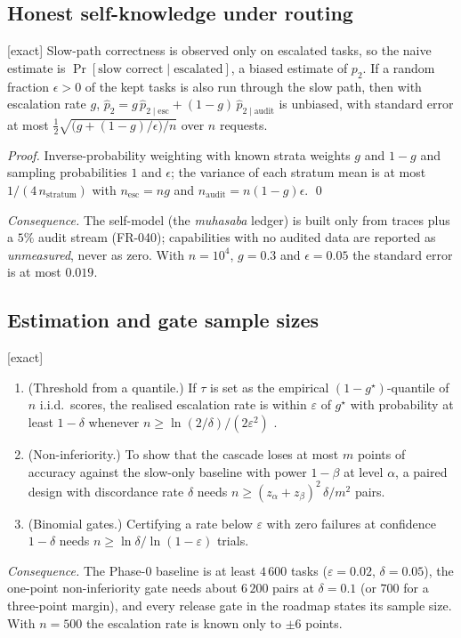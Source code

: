 \subsection{Honest self-knowledge under routing}

\begin{proposition}
\textnormal{[exact]}
\label{prop:audit}
Slow-path correctness is observed only on escalated tasks, so the naive
estimate is $\Pr[\text{slow correct}\mid\text{escalated}]$, a biased estimate of
$p_2$. If a random fraction $\epsilon>0$ of the kept tasks is also run through
the slow path, then with escalation rate $g$,
$\hat p_2=g\,\hat p_{2\mid\mathrm{esc}}+(1-g)\,\hat p_{2\mid\mathrm{audit}}$ is
unbiased, with standard error at most
$\tfrac{1}{2}\sqrt{\big(g+(1-g)/\epsilon\big)/n}$ over $n$ requests.
\end{proposition}
\begin{proof}
Inverse-probability weighting with known strata weights $g$ and $1-g$ and
sampling probabilities $1$ and $\epsilon$; the variance of each stratum mean is
at most $1/(4\,n_{\text{stratum}})$ with $n_{\text{esc}}=ng$ and
$n_{\text{audit}}=n(1-g)\epsilon$. \qed
\end{proof}
\emph{Consequence.} The self-model (the \emph{muhasaba} ledger) is built only
from traces plus a $5\%$ audit stream (FR-040); capabilities with no audited
data are reported as \emph{unmeasured}, never as zero. With $n=10^4$, $g=0.3$
and $\epsilon=0.05$ the standard error is at most $0.019$.

\subsection{Estimation and gate sample sizes}

\begin{proposition} \textnormal{[exact]}
\label{prop:samples}
\begin{enumerate}[label=(\roman*)]
\item (Threshold from a quantile.) If $\tau$ is set as the empirical
$(1-g^\star)$-quantile of $n$ i.i.d.\ scores, the realised escalation rate is
within $\varepsilon$ of $g^\star$ with probability at least $1-\delta$ whenever
$n\ge\ln(2/\delta)/(2\varepsilon^2)$ \cite{massart1990dkw}.
\item (Non-inferiority.) To show that the cascade loses at most $m$ points of
accuracy against the slow-only baseline with power $1-\beta$ at level $\alpha$,
a paired design with discordance rate $\delta$ needs
$n\ge(z_\alpha+z_\beta)^2\,\delta/m^2$ pairs.
\item (Binomial gates.) Certifying a rate below $\varepsilon$ with zero failures
at confidence $1-\delta$ needs $n\ge\ln\delta/\ln(1-\varepsilon)$ trials.
\end{enumerate}
\end{proposition}
\emph{Consequence.} The Phase-0 baseline is at least $4\,600$ tasks
($\varepsilon=0.02$, $\delta=0.05$), the one-point non-inferiority gate needs
about $6\,200$ pairs at $\delta=0.1$ (or $700$ for a three-point margin), and
every release gate in the roadmap states its sample size. With $n=500$ the
escalation rate is known only to $\pm6$ points.

